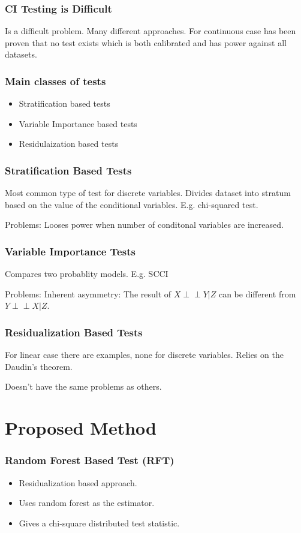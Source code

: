 \documentclass{beamer}
\def\ci{\perp\!\!\!\!\!\perp}
\begin{document}
\begin{frame}
	\frametitle{CI Testing is Difficult}
	Is a difficult problem.
	Many different approaches.
	For continuous case has been proven that no test exists which is both
	calibrated and has power against all datasets.
\end{frame}

\begin{frame}
	\frametitle{Main classes of tests}
	\begin{itemize}
		\item Stratification based tests
		\item Variable Importance based tests
		\item Residulaization based tests
	\end{itemize}
\end{frame}

\begin{frame}
	\frametitle{Stratification Based Tests}
	Most common type of test for discrete variables.
	Divides dataset into stratum based on the value of the conditional
	variables. E.g. chi-squared test.

	Problems: Looses power when number of conditonal variables are increased.
\end{frame}

\begin{frame}
	\frametitle{Variable Importance Tests}
	Compares two probablity models. E.g. SCCI

	Problems: Inherent asymmetry: The result of $ X \ci Y | Z $ can be 
	different from $ Y \ci X | Z $.
\end{frame}

\begin{frame}
	\frametitle{Residualization Based Tests}
	For linear case there are examples, none for discrete variables.
	Relies on the Daudin's theorem.

	Doesn't have the same problems as others.
\end{frame}

\section{Proposed Method}
\begin{frame}
	\frametitle{Random Forest Based Test (RFT)}
	\begin{itemize}
		\item Residualization based approach.
		\item Uses random forest as the estimator.
		\item Gives a chi-square distributed test statistic.
	\end{itemize}
\end{frame}
\end{document}
